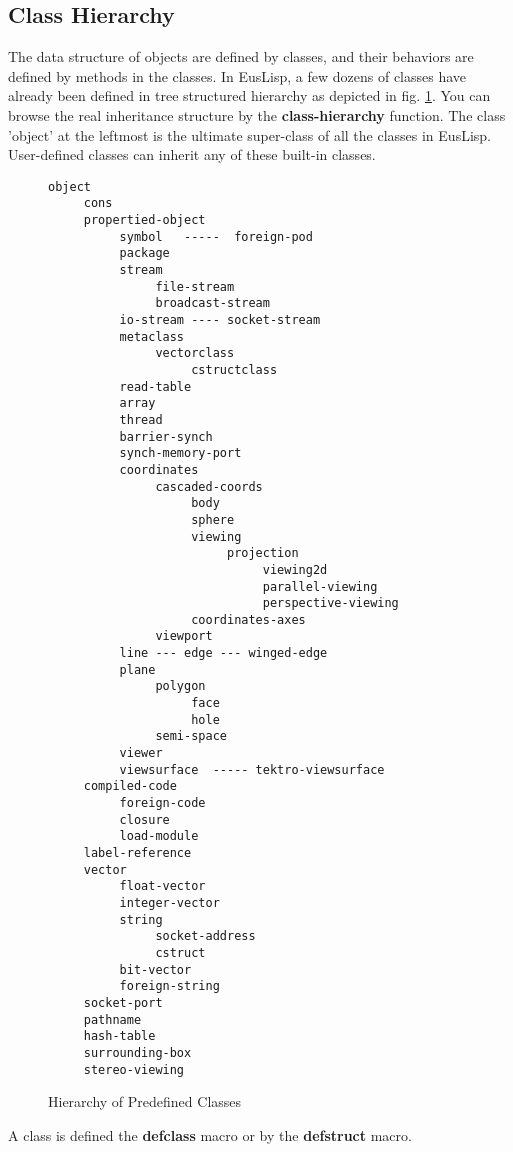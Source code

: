 \subsection{Class Hierarchy}

The data structure of objects are defined by classes,
and their behaviors are defined by methods in the classes.
In EusLisp, a few dozens of classes have already been 
defined in tree structured
hierarchy as depicted in fig. \ref{ClassHierarchy}.
You can browse the real inheritance structure by the 
{\bf class-hierarchy} function.
The class 'object' at the leftmost is the ultimate super-class of
all the classes in EusLisp.
User-defined classes can inherit any of these built-in classes.

\begin{figure}
\small
\begin{verbatim}
object
     cons
     propertied-object
          symbol   -----  foreign-pod
          package
          stream
               file-stream
               broadcast-stream
          io-stream ---- socket-stream
          metaclass
               vectorclass
                    cstructclass
          read-table
          array
          thread
          barrier-synch
          synch-memory-port
          coordinates
               cascaded-coords
                    body
                    sphere
                    viewing
                         projection
                              viewing2d
                              parallel-viewing
                              perspective-viewing
                    coordinates-axes
               viewport
          line --- edge --- winged-edge
          plane
               polygon
                    face
                    hole
               semi-space
          viewer
          viewsurface  ----- tektro-viewsurface
     compiled-code
          foreign-code
          closure
          load-module
     label-reference
     vector
          float-vector
          integer-vector
          string
               socket-address
               cstruct
          bit-vector
          foreign-string
     socket-port
     pathname
     hash-table
     surrounding-box
     stereo-viewing
\end{verbatim}
\normalsize
\caption{\label{ClassHierarchy}Hierarchy of Predefined Classes}
\end{figure}

A class is defined the {\bf defclass} macro or by the {\bf defstruct} macro.

